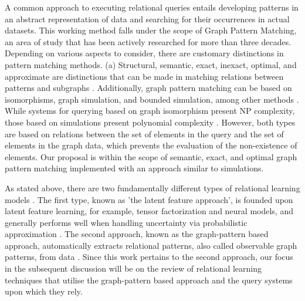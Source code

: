 \documentclass[mathematics,article,submit,pdftex,moreauthors]{Definitions/mdpi}
\begin{document}
A common approach to executing relational queries entails developing patterns in an abstract representation of data and searching for their occurrences in actual datasets\nocite{phdthesis,Barcelo,gupta2015neo4j,Segaran:2009:PSW:1696488,graphlog,van2016pgql}. This working method falls under the scope of Graph Pattern Matching, an area of study that has been actively researched for more than three decades. Depending on various aspects to consider, there are customary distinctions in pattern matching methods. (a) Structural, semantic, exact, inexact, optimal, and approximate are distinctions that can be made in matching relations between patterns and subgraphs \citep{matching}. Additionally, graph pattern matching can be based on isomorphisms, graph simulation, and bounded simulation, among other methods \citep{Milner,Fan,distance-join}. While systems for querying based on graph isomorphism present NP complexity, those based on simulations present polynomial complexity \citep{henzinger1995computing,ma_2014}. However, both types are based on relations between the set of elements in the query and the set of elements in the graph data, which prevents the evaluation of the non-existence of elements. Our proposal is within the scope of semantic, exact, and optimal graph pattern matching implemented with an approach similar to simulations.

As stated above, there are two fundamentally different types of relational learning models \citep{nickel2016review}. The first type, known as 'the latent feature approach', is founded upon latent feature learning, for example, tensor factorization and neural models, and generally performs well when handling uncertainty via probabilistic approximation \citep{Jacob:2014:LLR:2556195.2556225,typed,transe}. The second approach, known as the graph-pattern based approach, automatically extracts relational patterns, also called observable graph patterns, from data \citep{Leiva02mrdtl:a,Geamsakul2003}. Since this work pertains to the second approach, our focus in the subsequent discussion will be on the review of relational learning techniques that utilise the graph-pattern based approach and the query systems upon which they rely.
\end{document}
